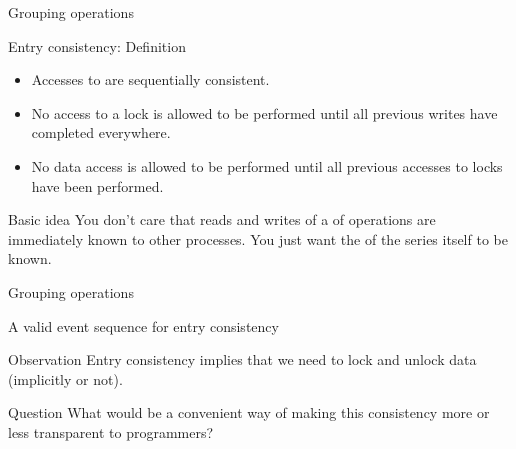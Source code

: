 \begin{slide}{Grouping operations}
  \begin{block}{Entry consistency: Definition}
    \begin{itemize}
    \item Accesses to  are sequentially consistent.
    \item No access to a lock is allowed to be performed until all previous writes have completed everywhere.
    \item No data access is allowed to be performed until all previous accesses to locks have been performed.
    \end{itemize}
  \end{block}
  \begin{block}{Basic idea} 
    You don't care that reads and writes of a  of operations are immediately known to other
    processes. You just want the  of the series itself to be known.
  \end{block}
\end{slide}
\begin{slide}{Grouping operations}
  \begin{block}{A valid event sequence for entry consistency}
    \begin{center}
    \end{center}
  \end{block}
  \begin{block}{Observation} 
    Entry consistency implies that we need to lock and unlock data (implicitly or not).
  \end{block}
  \begin{block}{Question}
    What would be a convenient way of making this consistency more or less transparent to programmers?
  \end{block}
\end{slide}
